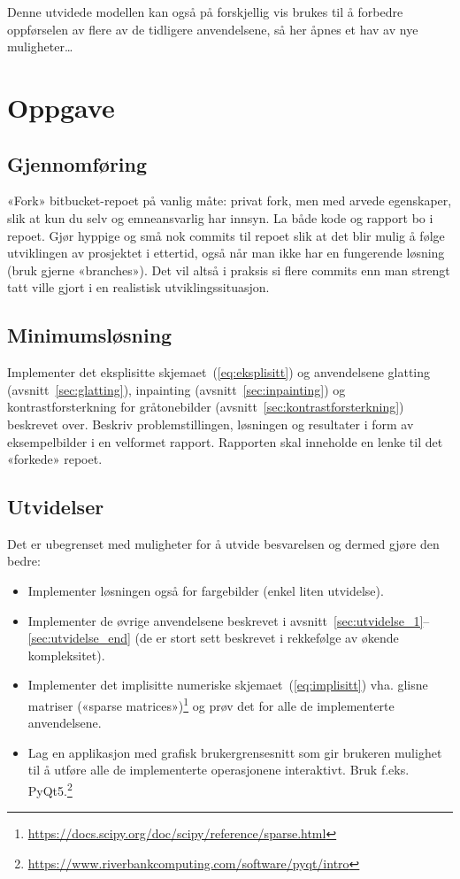 \documentclass[11pt,a4paper]{article}
\begin{document}
Denne utvidede modellen kan også på forskjellig vis brukes til å
forbedre oppførselen av flere av de tidligere anvendelsene, så her
åpnes et hav av nye muligheter\dots

\section{Oppgave}

\subsection{Gjennomføring}

«Fork» bitbucket-repoet på vanlig måte: privat fork, men med arvede
egenskaper, slik at kun du selv og emneansvarlig har innsyn. La både
kode og rapport bo i repoet. Gjør hyppige og små nok commits til
repoet slik at det blir mulig å følge utviklingen av prosjektet i
ettertid, også når man ikke har en fungerende løsning (bruk gjerne
«branches»). Det vil altså i praksis si flere commits enn man strengt
tatt ville gjort i en realistisk utviklingssituasjon.

\subsection{Minimumsløsning}

Implementer det eksplisitte skjemaet~(\ref{eq:eksplisitt}) og
anvendelsene glatting (avsnitt~\ref{sec:glatting}), inpainting
(avsnitt~\ref{sec:inpainting}) og kontrastforsterkning for
gråtonebilder (avsnitt~\ref{sec:kontrastforsterkning}) beskrevet over.
Beskriv problemstillingen, løsningen og resultater i form av
eksempelbilder i en velformet rapport. Rapporten skal inneholde en
lenke til det «forkede» repoet.

\subsection{Utvidelser}

Det er ubegrenset med muligheter for å utvide besvarelsen og dermed
gjøre den bedre:
\begin{itemize}[noitemsep]
\item Implementer løsningen også for fargebilder (enkel liten
  utvidelse).
\item Implementer de øvrige anvendelsene beskrevet i
  avsnitt~\ref{sec:utvidelse_1}--\ref{sec:utvidelse_end} (de er
  stort sett beskrevet i rekkefølge av økende kompleksitet).
\item Implementer det implisitte numeriske
  skjemaet~(\ref{eq:implisitt}) vha. glisne matriser («sparse
  matrices»)\footnote{\url{https://docs.scipy.org/doc/scipy/reference/sparse.html}}
  og prøv det for alle de implementerte anvendelsene.
\item Lag en applikasjon med grafisk brukergrensesnitt som gir
  brukeren mulighet til å utføre alle de implementerte operasjonene
  interaktivt. Bruk f.eks.
  PyQt5.\footnote{\url{https://www.riverbankcomputing.com/software/pyqt/intro}}
\end{itemize}
\end{document}
